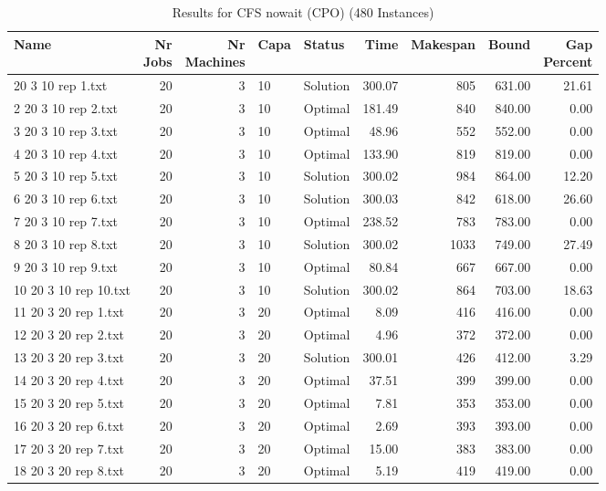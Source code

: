 \begin{longtable}{lrrllrrrr}
\caption{Results for CFS nowait (CPO) (480 Instances)}\\\toprule
Name & \shortstack{Nr\\Jobs} & \shortstack{Nr\\Machines} & Capa & Status  & Time & Makespan & Bound & \shortstack{Gap\\Percent}\\ \midrule
\endhead
\bottomrule
\endfoot
1 20 3 10 rep 1.txt & 20 & 3 & 10 & Solution & 300.07 & 805 & 631.00 & 21.61\\
2 20 3 10 rep 2.txt & 20 & 3 & 10 & Optimal & 181.49 & 840 & 840.00 &  0.00\\
3 20 3 10 rep 3.txt & 20 & 3 & 10 & Optimal & 48.96 & 552 & 552.00 &  0.00\\
4 20 3 10 rep 4.txt & 20 & 3 & 10 & Optimal & 133.90 & 819 & 819.00 &  0.00\\
5 20 3 10 rep 5.txt & 20 & 3 & 10 & Solution & 300.02 & 984 & 864.00 & 12.20\\
6 20 3 10 rep 6.txt & 20 & 3 & 10 & Solution & 300.03 & 842 & 618.00 & 26.60\\
7 20 3 10 rep 7.txt & 20 & 3 & 10 & Optimal & 238.52 & 783 & 783.00 &  0.00\\
8 20 3 10 rep 8.txt & 20 & 3 & 10 & Solution & 300.02 & 1033 & 749.00 & 27.49\\
9 20 3 10 rep 9.txt & 20 & 3 & 10 & Optimal & 80.84 & 667 & 667.00 &  0.00\\
10 20 3 10 rep 10.txt & 20 & 3 & 10 & Solution & 300.02 & 864 & 703.00 & 18.63\\
11 20 3 20 rep 1.txt & 20 & 3 & 20 & Optimal &  8.09 & 416 & 416.00 &  0.00\\
12 20 3 20 rep 2.txt & 20 & 3 & 20 & Optimal &  4.96 & 372 & 372.00 &  0.00\\
13 20 3 20 rep 3.txt & 20 & 3 & 20 & Solution & 300.01 & 426 & 412.00 &  3.29\\
14 20 3 20 rep 4.txt & 20 & 3 & 20 & Optimal & 37.51 & 399 & 399.00 &  0.00\\
15 20 3 20 rep 5.txt & 20 & 3 & 20 & Optimal &  7.81 & 353 & 353.00 &  0.00\\
16 20 3 20 rep 6.txt & 20 & 3 & 20 & Optimal &  2.69 & 393 & 393.00 &  0.00\\
17 20 3 20 rep 7.txt & 20 & 3 & 20 & Optimal & 15.00 & 383 & 383.00 &  0.00\\
18 20 3 20 rep 8.txt & 20 & 3 & 20 & Optimal &  5.19 & 419 & 419.00 &  0.00\\

\end{longtable}
